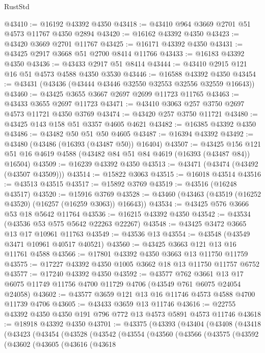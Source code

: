 \begin{lexlean}{RustStd}
\begin{coremodule}
@43410 := @16192 @43392 @4350
@43418 := @43410 @964 @3669 @2701 @51 @4573 @11767 @4350 @2894
@43420 := @16162 @43392 @4350
@43423 := @43420 @3669 @2701 @11767
@43425 := @16171 @43392 @4350
@43431 := @43425 @2917 @3668 @51 @2700 @8414 @11766
@43433 := @16183 @43392 @4350
@43436 := @43433 @2917 @51 @8414
@43444 := @43410 @2915 @121 @16 @51 @4573 @4588 @4350 @3530
@43446 := @16588 @43392 @4350
@43454 := @43431 (@43436 (@43444 @43446 @32550 @32553 @32556 @32559 @16643))
@43460 := @43425 @3655 @3667 @2697 @2699 @11723 @11765
@43463 := @43433 @3655 @2697 @11723
@43471 := @43410 @3063 @257 @3750 @2697 @4573 @11721 @4350 @3769
@43474 := @43420 @257 @3750 @11721
@43480 := @43425 @143 @158 @51 @3357 @4605 @4621
@43482 := @16385 @43392 @4350
@43486 := @43482 @50 @51 @50 @4605
@43487 := @16394 @43392
@43492 := @43480 (@43486 (@16393 (@43487 @50)) @16404)
@43507 := @43425
    @156
    @121
    @51
    @16
    @4619
    @4588
    (@43482 @84 @51 @84 @4619 (@16393 (@43487 @84)) @16504)
@43509 := @16239 @43392 @4350
@43513 := @43471 (@43474 (@43492 (@43507 @43509)))
@43514 := @15822 @3063
@43515 := @16018 @43514
@43516 := @43513 @43515
@43517 := @15892 @3769
@43519 := @43516 (@16248 @43517)
@43520 := @15916 @3769
@43528 := @43460 (@43463 (@43519 (@16252 @43520) (@16257 (@16259 @3063)) @16643))
@43534 := @43425 @576 @3666 @53 @18 @5642 @11764
@43536 := @16215 @43392 @4350
@43542 := @43534 (@43536 @53 @575 @5642 @22263 @22267)
@43548 := @43425 @3472 @3665 @13 @17 @10961 @11763
@43549 := @43536 @13
@43554 := @43548 (@43549 @3471 @10961 @40517 @40521)
@43560 := @43425 @3663 @121 @13 @16 @11761 @4588
@43566 := @17801 @43392 @4350 @3663 @13 @11750 @11759
@43575 := @17227 @43392 @4350 @1005 @3662 @18 @13 @11750 @11757 @6752
@43577 := @17240 @43392 @4350
@43592 := @43577
    @762
    @3661
    @13
    @17
    @6075
    @11749
    @11756
    @4700
    @11729
    @4706
    (@43549 @761 @6075 @24054 @24058)
@43602 := @43577 @3659 @121 @13 @16 @11746 @4573 @4588 @4700 @11739 @4706
@43605 := @43433 @3659 @13 @11746
@43616 := @22755 @43392 @4350 @4350 @191 @796 @772 @13 @4573 @5891 @4573 @11746
@43618 := @18918 @43392 @4350
@43701 := @43375
    (@43393
      (@43404
        (@43408
          (@43418
            (@43423
              (@43454
                (@43528
                  (@43542
                    (@43554
                      (@43560
                        (@43566
                          (@43575
                            (@43592
                              (@43602
                                (@43605
                                  (@43616
                                    (@43618

\end{coremodule}
\end{lexlean}

